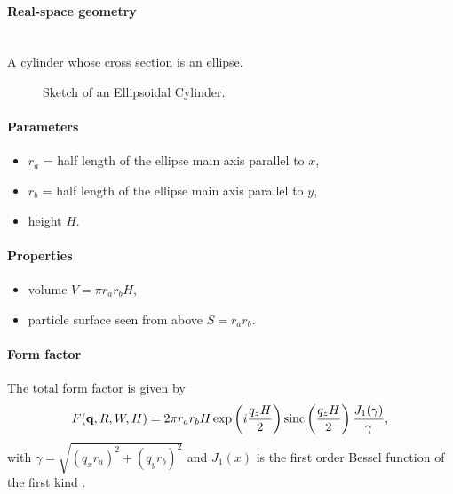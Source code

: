 \paragraph{Real-space geometry}\strut\\
A cylinder whose cross section is an ellipse.

\begin{figure}[ht]
\hfill
{}
\hfill
{}
\hfill
\caption{Sketch of an Ellipsoidal Cylinder.}
\label{fig:ellipscylinder}
\end{figure}

\paragraph{Parameters}
\begin{itemize}
\item $r_a$ = half length of the ellipse main axis parallel to $x$,
\item$r_b$ = half length of the ellipse main axis parallel to $y$, 
\item height $H$.
\end{itemize}

\paragraph{Properties}
\begin{itemize}
\item volume $V = \pi r_a r_bH$,
\item particle surface seen from above $S = r_a r_b$.
\end{itemize}

\paragraph{Form factor}
The total form factor is given by 
\begin{equation*}
F(\mathbf{q},R,W,H) = 2\pi r_a r_b H \exp\left(i\frac{q_z
  H}{2}\right)\operatorname{sinc}\left(\frac{q_z H}{2}\right) \frac{J_1(\gamma)}{\gamma},
\end{equation*}
with $\gamma=\sqrt{(q_x r_a)^2+(q_y r_b)^2}$ and $J_1(x)$ is the first order
Bessel function of the first kind \cite{AbSt64}.

